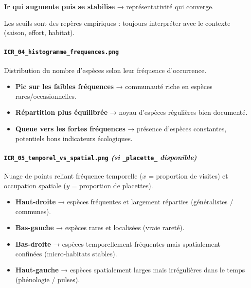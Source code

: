 \textbf{Ir qui augmente puis se stabilise} → représentativité qui
converge.

Les seuils sont des repères empiriques : toujours interpréter avec le
contexte (saison, effort, habitat).

\paragraph{\texorpdfstring{\texttt{ICR\_04\_histogramme\_frequences.png}}{ICR\_04\_histogramme\_frequences.png}}\label{icr_04_histogramme_frequences.png}

Distribution du nombre d'espèces selon leur fréquence d'occurrence.

\begin{itemize}
\tightlist
\item
  \textbf{Pic sur les faibles fréquences} → communauté riche en espèces
  rares/occasionnelles.
\item
  \textbf{Répartition plus équilibrée} → noyau d'espèces régulières bien
  documenté.
\item
  \textbf{Queue vers les fortes fréquences} → présence d'espèces
  constantes, potentiels bons indicateurs écologiques.
\end{itemize}

\paragraph{\texorpdfstring{\texttt{ICR\_05\_temporel\_vs\_spatial.png}
\emph{(si} \texttt{\_placette\_}
\emph{disponible)}}{ICR\_05\_temporel\_vs\_spatial.png (si \_placette\_ disponible)}}\label{icr_05_temporel_vs_spatial.png-si-_placette_-disponible}

Nuage de points reliant fréquence temporelle (\(x\) = proportion de
visites) et occupation spatiale (\(y\) = proportion de placettes).

\begin{itemize}
\tightlist
\item
  \textbf{Haut-droite} → espèces fréquentes et largement réparties
  (généralistes / communes).
\item
  \textbf{Bas-gauche} → espèces rares et localisées (vraie rareté).
\item
  \textbf{Bas-droite} → espèces temporellement fréquentes mais
  spatialement confinées (micro-habitats stables).
\item
  \textbf{Haut-gauche} → espèces spatialement larges mais irrégulières
  dans le temps (phénologie / pulses).
\end{itemize}

